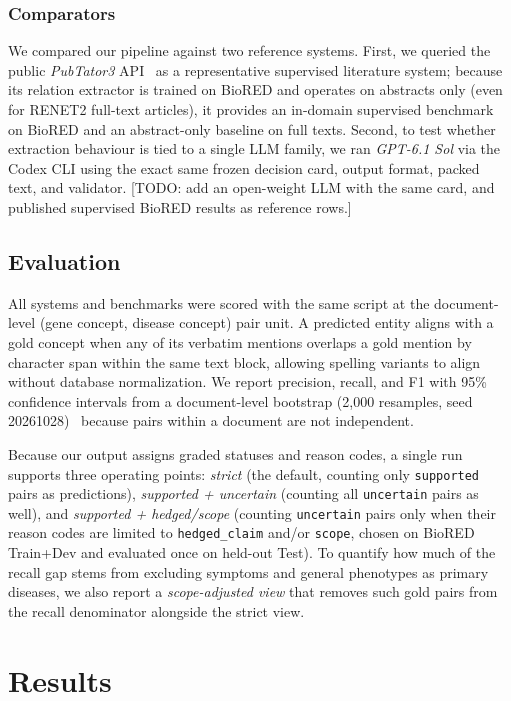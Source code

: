 \documentclass[preprint,10pt,letterpaper]{elsarticle}
\newcommand{\st}[1]{\texttt{#1}}             %
\newcommand{\todo}[1]{\textcolor{stneg}{[TODO: #1]}}
\begin{document}
\subsubsection{Comparators}
We compared our pipeline against two reference systems. First, we queried the public \emph{PubTator3} API~\cite{wei2024pubtator3} as a representative supervised literature system; because its relation extractor is trained on BioRED and operates on abstracts only (even for RENET2 full-text articles), it provides an in-domain supervised benchmark on BioRED and an abstract-only baseline on full texts. Second, to test whether extraction behaviour is tied to a single LLM family, we ran \emph{GPT-6.1 Sol} via the Codex CLI using the exact same frozen decision card, output format, packed text, and validator. \todo{add an open-weight LLM with the same card, and published supervised BioRED results as reference rows.}

\subsection{Evaluation}\label{sec:eval}
All systems and benchmarks were scored with the same script at the document-level (gene concept, disease concept) pair unit. A predicted entity aligns with a gold concept when any of its verbatim mentions overlaps a gold mention by character span within the same text block, allowing spelling variants to align without database normalization. We report precision, recall, and F1 with 95\% confidence intervals from a document-level bootstrap (2,000 resamples, seed 20261028)~\cite{efron1993bootstrap} because pairs within a document are not independent.

Because our output assigns graded statuses and reason codes, a single run supports three operating points: \emph{strict} (the default, counting only \st{supported} pairs as predictions), \emph{supported + uncertain} (counting all \st{uncertain} pairs as well), and \emph{supported + hedged/scope} (counting \st{uncertain} pairs only when their reason codes are limited to \st{hedged\_claim} and/or \st{scope}, chosen on BioRED Train+Dev and evaluated once on held-out Test). To quantify how much of the recall gap stems from excluding symptoms and general phenotypes as primary diseases, we also report a \emph{scope-adjusted view} that removes such gold pairs from the recall denominator alongside the strict view.

\section{Results}
\end{document}
